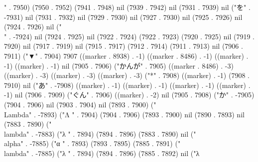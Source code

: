 {" . 7950) (7950 . 7952) (7941 . 7948) nil (7939 . 7942) nil (7931 . 7939) nil ("を" . -7931) nil (7931 . 7932) nil (7929 . 7930) nil (7927 . 7930) nil (7925 . 7926) nil (7924 . 7926) nil ("\\" . -7924) nil (7924 . 7925) nil (7922 . 7924) (7922 . 7923) (7920 . 7925) nil (7919 . 7920) nil (7917 . 7919) nil (7915 . 7917) (7912 . 7914) (7911 . 7913) nil (7906 . 7911) ("▼" . 7904) 7907 ((marker . 8938) . -1) ((marker . 8486) . -1) ((marker) . -1) ((marker) . -1) nil (7905 . 7906) ("かんが" . 7905) ((marker . 8486) . -3) ((marker) . -3) ((marker) . -3) ((marker) . -3) ("*" . 7908) ((marker) . -1) (7908 . 7910) nil ("あ" . -7908) ((marker) . -1) ((marker) . -1) ((marker) . -1) ((marker) . -1) nil (7906 . 7909) ("ぐん" . 7906) ((marker) . -2) nil (7905 . 7908) ("か" . -7905) (7904 . 7906) nil (7903 . 7904) nil (7893 . 7900) ("\\Lambda" . -7893) ("Λ
" . 7904) (7904 . 7906) (7893 . 7900) nil (7890 . 7893) nil (7883 . 7890) ("\\lambda" . -7883) ("λ
" . 7894) (7894 . 7896) (7883 . 7890) nil ("\\alpha" . -7885) ("α
" . 7893) (7893 . 7895) (7885 . 7891) ("\\lambda" . -7885) ("λ
" . 7894) (7894 . 7896) (7885 . 7892) nil ("λ
}
